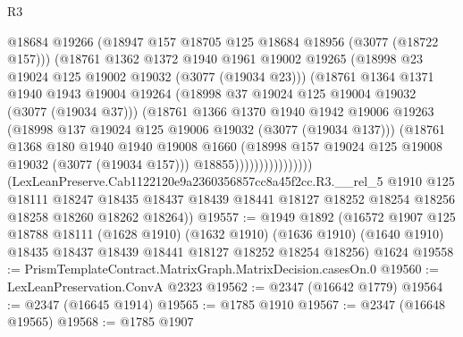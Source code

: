 \begin{lexlean}{R3}
\begin{coremodule}
                              @18684
                              @19266
                              (@18947 @157 @18705 @125 @18684 @18956 (@3077 (@18722 @157)))
                              (@18761
                                @1362
                                @1372
                                @1940
                                @1961
                                @19002
                                @19265
                                (@18998 @23 @19024 @125 @19002 @19032 (@3077 (@19034 @23)))
                                (@18761
                                  @1364
                                  @1371
                                  @1940
                                  @1943
                                  @19004
                                  @19264
                                  (@18998 @37 @19024 @125 @19004 @19032 (@3077 (@19034 @37)))
                                  (@18761
                                    @1366
                                    @1370
                                    @1940
                                    @1942
                                    @19006
                                    @19263
                                    (@18998 @137 @19024 @125 @19006 @19032 (@3077 (@19034 @137)))
                                    (@18761
                                      @1368
                                      @180
                                      @1940
                                      @1940
                                      @19008
                                      @1660
                                      (@18998 @157 @19024 @125 @19008 @19032 (@3077 (@19034 @157)))
                                      @18855))))))))))))))))
      (LexLeanPreserve.Cab1122120e9a2360356857cc8a45f2cc.R3.__rel_5
        @1910
        @125
        @18111
        @18247
        @18435
        @18437
        @18439
        @18441
        @18127
        @18252
        @18254
        @18256
        @18258
        @18260
        @18262
        @18264))
@19557 := @1949
    @1892
    (@16572
      @1907
      @125
      @18788
      @18111
      (@1628 @1910)
      (@1632 @1910)
      (@1636 @1910)
      (@1640 @1910)
      @18435
      @18437
      @18439
      @18441
      @18127
      @18252
      @18254
      @18256)
    @1624
@19558 := PrismTemplateContract.MatrixGraph.MatrixDecision.casesOn.{0}
@19560 := LexLeanPreservation.ConvA @2323
@19562 := @2347 (@16642 @1779)
@19564 := @2347 (@16645 @1914)
@19565 := @1785 @1910
@19567 := @2347 (@16648 @19565)
@19568 := @1785 @1907

\end{coremodule}
\end{lexlean}
